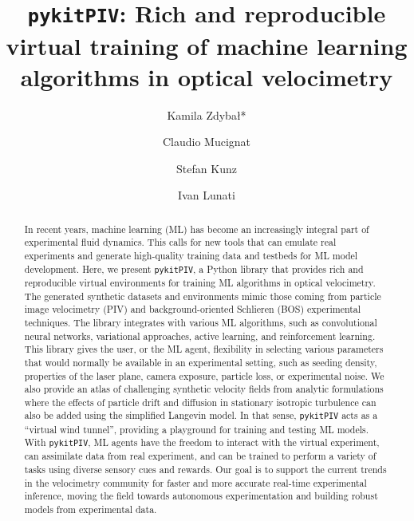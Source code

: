 \documentclass[a4paper,fleqn]{cas-dc}
\begin{document}

\title [mode = title]{\texttt{pykitPIV}: Rich and reproducible virtual training of machine learning algorithms in optical velocimetry}

\author[EMPA]{Kamila Zdyba\l{}*}

\author[EMPA]{Claudio Mucignat}
\author[EMPA]{Stefan Kunz}
\author[EMPA]{Ivan Lunati}

\address[EMPA]{Laboratory for Computational Engineering, Swiss Federal Laboratories for Materials Science and Technology, Empa, Dübendorf, Switzerland}

\begin{abstract}
In recent years, machine learning (ML) has become an increasingly integral part of experimental fluid dynamics. 
This calls for new tools that can emulate real experiments and generate high-quality training data and testbeds for ML model development.
Here, we present \texttt{pykitPIV}, a Python library that provides rich and reproducible virtual environments for training ML algorithms in optical velocimetry. The generated synthetic datasets and environments mimic those coming from particle image velocimetry (PIV) and background-oriented Schlieren (BOS) experimental techniques. 
The library integrates with various ML algorithms, such as convolutional neural networks, variational approaches, active learning, and reinforcement learning. This library gives the user, or the ML agent, flexibility in selecting various parameters that would normally be available in an experimental setting, such as seeding density, properties of the laser plane, camera exposure, particle loss, or experimental noise. We also provide an atlas of challenging synthetic velocity fields from analytic formulations where the effects of particle drift and diffusion in stationary isotropic turbulence can also be added using the simplified Langevin model. In that sense, \texttt{pykitPIV} acts as a ``virtual wind tunnel'', providing a playground for training and testing ML models. 
With \texttt{pykitPIV}, ML agents have the freedom to interact with the virtual experiment, can assimilate data from real experiment, and can be trained to perform a variety of tasks using diverse sensory cues and rewards. Our goal is to support the current trends in the velocimetry community for faster and more accurate real-time experimental inference, moving the field towards autonomous experimentation and building robust models from experimental data.
\end{abstract}
\end{document}
